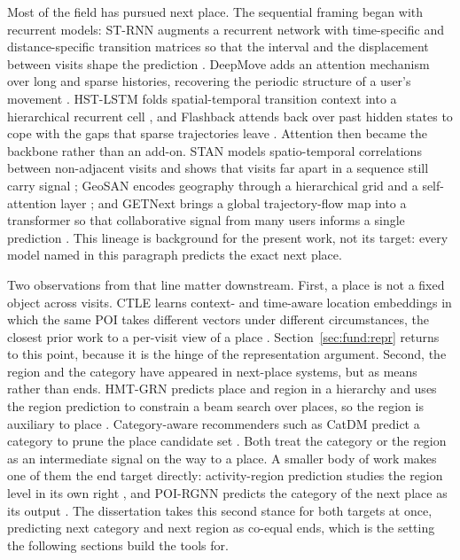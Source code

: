 Most of the field has pursued next place. The sequential framing began with
recurrent models: ST-RNN augments a recurrent network with time-specific and
distance-specific transition matrices so that the interval and the displacement
between visits shape the prediction \cite{liu2016strnn}. DeepMove adds an attention
mechanism over long and sparse histories, recovering the periodic structure of a
user's movement \cite{feng2018deepmove}. HST-LSTM folds spatial-temporal transition
context into a hierarchical recurrent cell \cite{kong2018hstlstm}, and Flashback
attends back over past hidden states to cope with the gaps that sparse trajectories
leave \cite{yang2020flashback}. Attention then became the backbone rather than an
add-on. STAN models spatio-temporal correlations between non-adjacent visits and
shows that visits far apart in a sequence still carry signal \cite{luo2021stan};
GeoSAN encodes geography through a hierarchical grid and a self-attention layer
\cite{lian2020geosan}; and GETNext brings a global trajectory-flow map into a
transformer so that collaborative signal from many users informs a single
prediction \cite{yang2022getnext}. This lineage is background for the present work,
not its target: every model named in this paragraph predicts the exact next place.

Two observations from that line matter downstream. First, a place is not a fixed
object across visits. CTLE learns context- and time-aware location embeddings in
which the same POI takes different vectors under different circumstances, the closest
prior work to a per-visit view of a place \cite{lin2021ctle}. Section~\ref{sec:fund:repr}
returns to this point, because it is the hinge of the representation argument.
Second, the region and the category have appeared in next-place systems, but as
means rather than ends. HMT-GRN predicts place and region in a hierarchy and uses the
region prediction to constrain a beam search over places, so the region is auxiliary
to place \cite{Lim2022}. Category-aware recommenders such as CatDM predict a category
to prune the place candidate set \cite{yu2020catdm}. Both treat the category or the
region as an intermediate signal on the way to a place. A smaller body of work makes
one of them the end target directly: activity-region prediction studies the region
level in its own right \cite{zhu2022drrgnn}, and POI-RGNN predicts the category of the
next place as its output \cite{capanema2023poirgnn}. The dissertation takes this
second stance for both targets at once, predicting next category and next region as
co-equal ends, which is the setting the following sections build the tools for.

